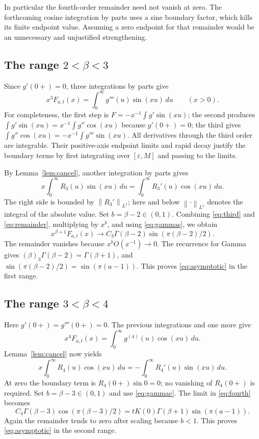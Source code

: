 \documentclass[11pt]{article}
\theoremstyle{remark}\newtheorem{remark}[theorem]{Remark}
\newcommand{\norm}[1]{\left\lVert#1\right\rVert}
\begin{document}
In particular the fourth-order remainder need not vanish at zero.
The forthcoming cosine integration by parts uses a sine boundary
factor, which kills its finite endpoint value. Assuming a zero
endpoint for that remainder would be an unnecessary and unjustified
strengthening.

\subsection{The range $2<\beta<3$}
Since $g'(0+)=0$, three integrations by parts give
\begin{equation}\label{eq:third}
 x^3F_{a,t}(x)=\int_0^\infty g'''(u)\sin(xu)\,du
 \qquad(x>0).
\end{equation}
For completeness, the first step is
$F=-x^{-1}\int g'\sin(xu)$; the second produces
$\int g'\sin(xu)=x^{-1}\int g''\cos(xu)$ because $g'(0+)=0$;
the third gives $\int g''\cos(xu)=-x^{-1}\int g'''\sin(xu)$.
All derivatives through the third order are integrable. Their
positive-axis endpoint limits and rapid decay justify the boundary
terms by first integrating over $[\varepsilon,M]$ and passing to
the limits.

By Lemma~\ref{lem:cancel}, another integration by parts gives
\[
 x\int_0^\infty R_3(u)\sin(xu)\,du
 =\int_0^\infty R_3'(u)\cos(xu)\,du.
\]
The right side is bounded by $\norm{R_3'}_{L^1}$; here and below
$\norm{\cdot}_{L^1}$ denotes the integral of the absolute value.
Set $b=\beta-2\in(0,1)$. Combining \eqref{eq:third} and
\eqref{eq:remainder}, multiplying by $x^b$, and using
\eqref{eq:gammas}, we obtain
\[
 x^{\beta+1}F_{a,t}(x)\longrightarrow
 C_3\Gamma(\beta-2)\sin(\pi(\beta-2)/2).
\]
The remainder vanishes because $x^bO(x^{-1})\to0$.
The recurrence for Gamma gives
$(\beta)_3\Gamma(\beta-2)=\Gamma(\beta+1)$, and
$\sin(\pi(\beta-2)/2)=\sin(\pi(a-1))$. This proves
\eqref{eq:asymptotic} in the first range.

\subsection{The range $3<\beta<4$}
Here $g'(0+)=g'''(0+)=0$. The previous integrations and one more
give
\begin{equation}\label{eq:fourth}
 x^4F_{a,t}(x)=\int_0^\infty g^{(4)}(u)\cos(xu)\,du.
\end{equation}
Lemma~\ref{lem:cancel} now yields
\[
 x\int_0^\infty R_4(u)\cos(xu)\,du
 =-\int_0^\infty R_4'(u)\sin(xu)\,du.
\]
At zero the boundary term is $R_4(0+)\sin0=0$; no vanishing of
$R_4(0+)$ is required. Set $b=\beta-3\in(0,1)$ and use
\eqref{eq:gammac}. The limit in \eqref{eq:fourth} becomes
\[
 C_4\Gamma(\beta-3)\cos(\pi(\beta-3)/2)
 =tK(0)\Gamma(\beta+1)\sin(\pi(a-1)).
\]
Again the remainder tends to zero after scaling because $b<1$.
This proves \eqref{eq:asymptotic} in the second range.
\end{document}
